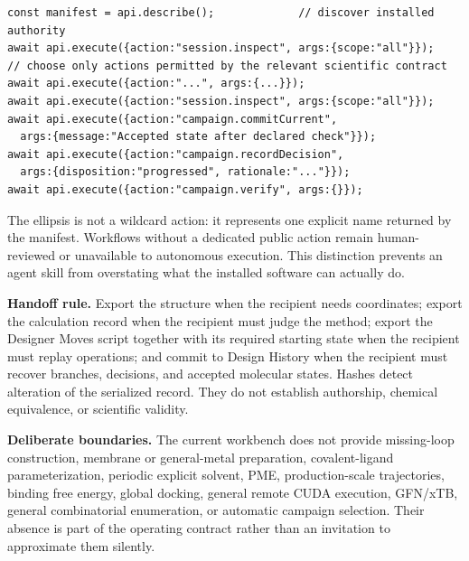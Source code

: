 \begin{small}
\begin{lstlisting}
const manifest = api.describe();             // discover installed authority
await api.execute({action:"session.inspect", args:{scope:"all"}});
// choose only actions permitted by the relevant scientific contract
await api.execute({action:"...", args:{...}});
await api.execute({action:"session.inspect", args:{scope:"all"}});
await api.execute({action:"campaign.commitCurrent",
  args:{message:"Accepted state after declared check"}});
await api.execute({action:"campaign.recordDecision",
  args:{disposition:"progressed", rationale:"..."}});
await api.execute({action:"campaign.verify", args:{}});
\end{lstlisting}

The ellipsis is not a wildcard action: it represents one explicit name returned by the manifest. Workflows without a dedicated public action remain human-reviewed or unavailable to autonomous execution. This distinction prevents an agent skill from overstating what the installed software can actually do.

\textbf{Handoff rule.} Export the structure when the recipient needs coordinates; export the calculation record when the recipient must judge the method; export the Designer Moves script together with its required starting state when the recipient must replay operations; and commit to Design History when the recipient must recover branches, decisions, and accepted molecular states. Hashes detect alteration of the serialized record. They do not establish authorship, chemical equivalence, or scientific validity.

\textbf{Deliberate boundaries.} The current workbench does not provide missing-loop construction, membrane or general-metal preparation, covalent-ligand parameterization, periodic explicit solvent, PME, production-scale trajectories, binding free energy, global docking, general remote CUDA execution, GFN/xTB, general combinatorial enumeration, or automatic campaign selection. Their absence is part of the operating contract rather than an invitation to approximate them silently.

\end{small}
